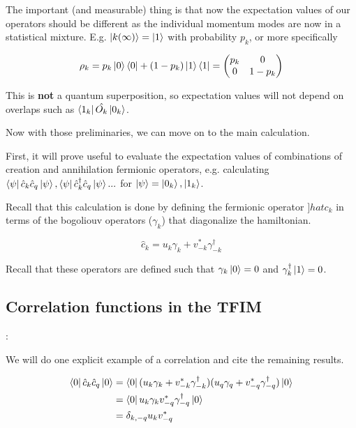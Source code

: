\documentclass{article}
\begin{document}
The important (and measurable) thing is that now the expectation values of our operators should be different as the individual momentum modes are now in a statistical mixture. E.g. $\ket{k (\infty)} = \ket{1}$ with probability $p_k$, or more specifically 

\[
\rho_k = p_k \ket{0}\bra{0} + (1 - p_k) \ket{1}\bra{1} =
\begin{pmatrix}
p_k & 0 \\
0 & 1 - p_k
\end{pmatrix}
\]

This is \textbf{not} a quantum superposition, so expectation values will not depend on overlaps such as $\bra{1_k} \hat{O_k} \ket{0_k}$.

Now with those preliminaries, we can move on to the main calculation. 

First, it will prove useful to evaluate the expectation values of combinations of creation and annihilation fermionic operators, e.g. calculating $\bra{\psi} \hat{c}_k \hat {c}_q \ket{\psi}, \bra{\psi} \hat{c}^\dagger_k \hat {c}_q \ket{\psi}...$ for $\ket{\psi} = \ket{0_k}, \ket{1_k}$.

Recall that this calculation is done by defining the fermionic operator $]hat c_k$ in terms of the bogoliouv operators ($\gamma_k$) that diagonalize the hamiltonian.

\begin{equation}
    \hat{c}_k = u_k \gamma_k + v^*_{-k} \gamma^\dagger_{-k}
\end{equation}

Recall that these operators are defined such that $\gamma_k \ket{0}=0$ and $\gamma^\dagger_k \ket{1}= 0$.

\subsection{Correlation functions in the TFIM}:

We will do one explicit example of a correlation and cite the remaining results.

\begin{align}
    \bra{0} \hat{c}_k \hat{c}_q \ket{0} &= 
    \bra{0} (u_k \gamma_k + v^*_{-k} \gamma^\dagger_{-k}) (u_q \gamma_q + v^*_{-q} \gamma^\dagger_{-q}) \ket{0} \\
    &= \bra{0} u_k \gamma_k v^*_{-q} \gamma^\dagger_{-q} \ket{0}\\
    &= \delta_{k,-q} u_k v^*_{-q}
\end{align}
\end{document}
